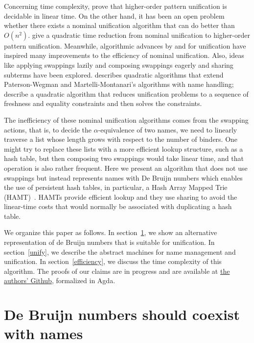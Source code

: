 \documentclass[a4paper,UKenglish]{lipics-v2016}
\begin{document}
Concerning time complexity, \citet{qian_unification_1996} prove that
higher-order pattern unification is decidable in linear time.  On the
other hand, it has been an open problem whether there exists a nominal
unification algorithm that can do better than
$O(n^2)$. \citet{levy_nominal_2012} give a quadratic time reduction
from nominal unification to higher-order pattern unification.
Meanwhile, algorithmic advances by \citet{paterson_linear_1978} and
\citet{martelli_efficient_1982} for unification have inspired many
improvements to the efficiency of nominal unification.  Also, ideas
like applying swappings lazily and composing swappings eagerly and
sharing subterms have been explored. \citet{calves_complexity_2010}
describes quadratic algorithms that extend Paterson-Wegman and
Martelli-Montanari's algorithms with name handling;
\citet{levy_efficient_2010} describe a quadratic algorithm that
reduces unification problems to a sequence of freshness and equality
constraints and then solves the constraints.

The inefficiency of these nominal unification algorithms comes from
the swapping actions, that is, to decide the $\alpha$-equivalence of
two names, we need to linearly traverse a list whose length grows with
respect to the number of binders.  One might try to replace these
lists with a more efficient lookup structure, such as a hash table,
but then composing two swappings would take linear time, and that
operation is also rather frequent.  Here we present an algorithm that
does not use swappings but instead represents names with De Bruijn
numbers which enables the use of persistent hash tables, in
particular, a Hash Array Mapped Trie
(HAMT)~\citep{bagwell_ideal_2001}. HAMTs provide efficient lookup and
they use sharing to avoid the linear-time costs that would normally be
associated with duplicating a hash table.

We organize this paper as follows.  In section~\ref{closures}, we show
an alternative representation of de Bruijn numbers that is suitable
for unification.  In section~\ref{unify}, we describe the abstract
machines for name management and unification.  In
section~\ref{efficiency}, we discuss the time complexity of this
algorithm. The proofs of our claims are in progress and are available
at \href{https://github.com/mvcccccc/UNIF2018}{the authors' Github},
formalized in Agda.
  

\section{De Bruijn numbers should coexist with names}
\label{closures}
\end{document}

